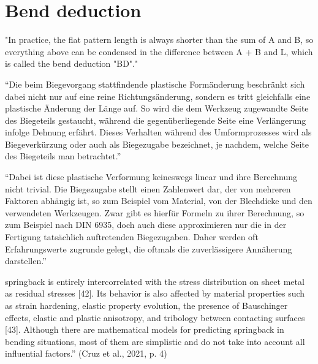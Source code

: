 \section{Bend deduction}
"In practice, the flat pattern length is always shorter than the sum of A and B, so everything above can be condensed in the difference between A + B and L, which is called the bend deduction "BD"." 
\cite{by_artsciencebending_2016a}

“Die beim Biegevorgang stattfindende plastische Formänderung beschränkt sich dabei nicht nur auf eine reine Richtungsänderung, sondern es tritt gleichfalls eine plastische Änderung der Länge auf. So wird die dem Werkzeug zugewandte Seite des Biegeteils gestaucht, während die gegenüberliegende Seite eine Verlängerung infolge Dehnung erfährt. Dieses Verhalten während des Umformprozesses wird als Biegeverkürzung oder auch als Biegezugabe bezeichnet, je nachdem, welche Seite des Biegeteils man betrachtet.” 
\cite{rockhausen_integrationsolidworksprozesskette_2010} 

“Dabei ist diese plastische Verformung keineswegs linear und ihre Berechnung nicht trivial. Die Biegezugabe stellt einen Zahlenwert dar, der von mehreren Faktoren abhängig ist, so zum Beispiel vom Material, von der Blechdicke und den verwendeten Werkzeugen. Zwar gibt es hierfür Formeln zu ihrer Berechnung, so zum Beispiel nach DIN 6935, doch auch diese approximieren nur die in der Fertigung tatsächlich auftretenden Biegezugaben. Daher werden oft Erfahrungswerte zugrunde gelegt, die oftmals die zuverlässigere Annäherung darstellen.” 
\cite{rockhausen_integrationsolidworksprozesskette_2010} 

springback is entirely intercorrelated with the stress distribution on sheet metal as residual stresses [42]. Its behavior is also affected by material properties such as strain hardening, elastic property evolution, the presence of Bauschinger effects, elastic and plastic anisotropy, and tribology between contacting surfaces [43]. Although there are mathematical models for predicting springback in bending situations, most of them are simplistic and do not take into account all influential factors.” (Cruz et al., 2021, p. 4) 

